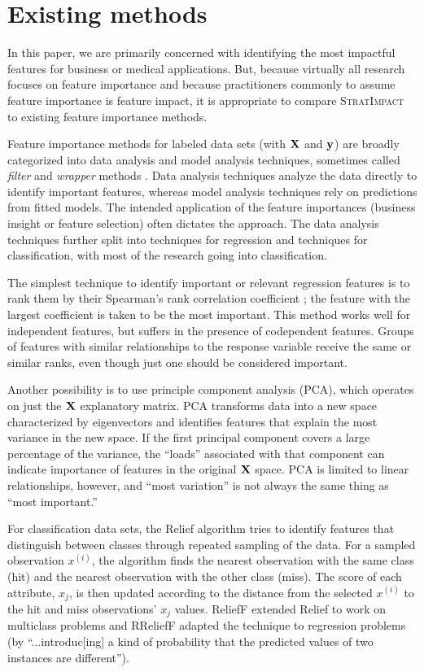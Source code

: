 \documentclass[11pt]{article}
\newcommand{\simp}{\fontfamily{cmr}\textsc{\small StratImpact}}
\renewcommand{\xi}{x^{(i)}}
\begin{document}
 
\section{Existing methods}\label{sec:existing}

In this paper, we are primarily concerned with identifying the most impactful features for business or medical applications. But, because virtually all research focuses on feature importance and because practitioners commonly to assume feature importance is feature impact, it is appropriate to compare \simp{} to existing feature importance methods.

Feature importance methods for labeled data sets (with $\bf X$ and $\bf y$) are broadly categorized into data analysis and model analysis techniques, sometimes called {\em filter} and {\em wrapper} methods \citep{tsanas}. Data analysis techniques analyze the data directly to identify important features, whereas model analysis techniques rely on predictions from fitted models.  The intended application of the feature importances (business insight or feature selection) often dictates the approach.  The data analysis techniques further split into techniques for regression and techniques for classification, with most of the research going into classification.

The simplest technique to identify important or relevant regression features is to rank them by their Spearman's rank correlation coefficient \citep{spearmans}; the feature with the largest coefficient is taken to be the most important. This method works well for independent features, but suffers in the presence of codependent features.   Groups of features with similar relationships to the response variable receive the same or similar ranks, even though just one should be considered important.

Another possibility is to use principle component analysis (PCA), which operates on just the $\bf X$ explanatory matrix. PCA transforms data into a new space characterized by eigenvectors and identifies features that explain the most variance in the new space. If the first principal component covers a large percentage of the variance, the ``loads'' associated with that component can indicate importance of features in the original $\bf X$ space. PCA is limited to linear relationships, however, and ``most variation'' is not always the same thing as ``most important.''

For classification data sets, the Relief algorithm \citep{relief} tries to identify features that distinguish between classes through repeated sampling of the data. For a sampled observation $\xi$, the algorithm finds the nearest observation with the same class (hit) and the nearest observation with the other class (miss). The score of each attribute, $x_j$, is then updated according to the distance from the selected $\xi$ to the hit and miss observations'  $x_j$ values. ReliefF \citep{ReliefF} extended Relief to work on multiclass problems and RReliefF \citep{RReliefF} adapted the technique to regression problems (by ``...introduc[ing] a kind of probability that the predicted values of two instances are different'').
\end{document}
